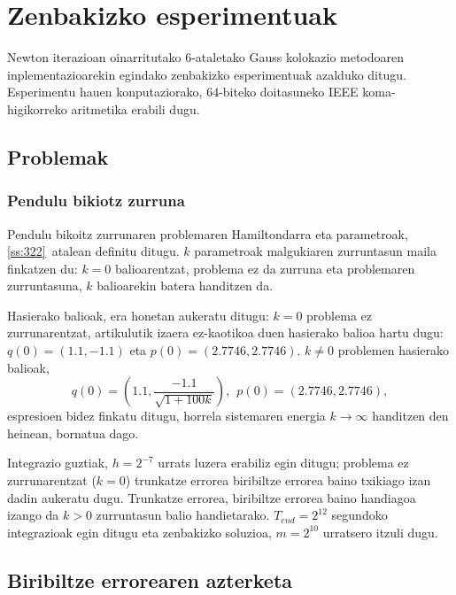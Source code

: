 \clearpage

\section{Zenbakizko esperimentuak}
\label{sec:7.7}

\label{s:ne}

Newton iterazioan oinarritutako $6$-ataletako Gauss kolokazio metodoaren inplementazioarekin egindako zenbakizko esperimentuak azalduko ditugu. Esperimentu hauen konputaziorako, $64$-biteko doitasuneko IEEE koma-higikorreko aritmetika erabili dugu.

\subsection{Problemak}

\subsubsection*{Pendulu bikiotz zurruna}

Pendulu bikoitz zurrunaren problemaren Hamiltondarra eta parametroak, \ref{ss:322}~atalean definitu ditugu. $k$ parametroak malgukiaren zurruntasun maila finkatzen du: $k=0$ balioarentzat, problema ez da zurruna eta problemaren zurruntasuna, $k$ balioarekin batera handitzen da. 

Hasierako balioak, era honetan aukeratu ditugu: $k=0$ problema ez zurrunarentzat, \cite{Dumitru} artikulutik izaera ez-kaotikoa duen hasierako balioa hartu dugu: $q(0)=(1.1, -1.1)$ eta $p(0)=(2.7746,2.7746)$. $k\neq 0$ problemen hasierako balioak,
\begin{equation*}
q(0)=\left(1.1, \frac{-1.1}{\sqrt{1+100k}}\right), \ \ 
p(0)=(2.7746,2.7746),
\end{equation*}
espresioen bidez finkatu  ditugu, horrela sistemaren energia $k \rightarrow \infty$ handitzen den heinean, bornatua dago.

Integrazio guztiak, $h=2^{-7}$ urrats luzera erabiliz egin ditugu; problema ez zurrunarentzat ($k=0$) trunkatze errorea biribiltze errorea baino txikiago izan dadin aukeratu dugu. Trunkatze errorea, biribiltze errorea baino handiagoa izango da $k>0$ zurruntasun balio handietarako. $T_{end}=2^{12}$ segundoko integrazioak egin ditugu eta zenbakizko soluzioa, $m=2^{10}$ urratsero itzuli dugu. 

\subsection{Biribiltze errorearen azterketa}

